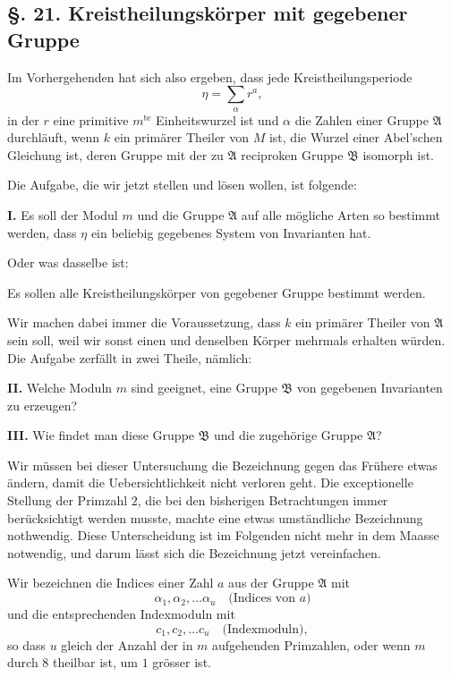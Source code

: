 \documentclass[12pt,a4paper]{article}
\theoremstyle{plain}
\theoremstyle{definition}
\theoremstyle{remark}
\begin{document}
\subsection*{\S. 21. Kreistheilungskörper mit gegebener Gruppe}

Im Vorhergehenden hat sich also ergeben, dass jede Kreistheilungsperiode
\[
\eta = \sum_{\alpha} r^{a},
\]
in der $r$ eine primitive $m^{\text{te}}$ Einheitswurzel ist und $\alpha$ die Zahlen
einer Gruppe $\mathfrak{A}$ durchläuft, wenn $k$ ein primärer Theiler von $M$
ist, die Wurzel einer Abel'schen Gleichung ist, deren Gruppe mit
der zu $\mathfrak{A}$ reciproken Gruppe $\mathfrak{B}$ isomorph ist.

Die Aufgabe, die wir jetzt stellen und lösen wollen, ist folgende:

\medskip\noindent\textbf{I.} Es soll der Modul $m$ und die Gruppe $\mathfrak{A}$ auf alle mögliche Arten so bestimmt werden, dass $\eta$ ein beliebig gegebenes System von Invarianten hat.

Oder was dasselbe ist:

Es sollen alle Kreistheilungskörper von gegebener Gruppe bestimmt werden.

\medskip
Wir machen dabei immer die Voraussetzung, dass $k$ ein primärer Theiler von $\mathfrak{A}$ sein soll, weil wir sonst einen und denselben Körper mehrmals erhalten würden. Die Aufgabe zerfällt in zwei Theile, nämlich:

\medskip\noindent\textbf{II.} Welche Moduln $m$ sind geeignet, eine Gruppe $\mathfrak{B}$ von gegebenen Invarianten zu erzeugen?

\medskip\noindent\textbf{III.} Wie findet man diese Gruppe $\mathfrak{B}$ und die zugehörige Gruppe $\mathfrak{A}$?

\medskip
Wir müssen bei dieser Untersuchung die Bezeichnung gegen das Frühere etwas ändern, damit die Uebersichtlichkeit nicht verloren geht. Die exceptionelle Stellung der Primzahl $2$, die bei den bisherigen Betrachtungen immer berücksichtigt werden musste, machte eine etwas umständliche Bezeichnung nothwendig. Diese Unterscheidung ist im Folgenden nicht mehr in dem Maasse notwendig, und darum lässt sich die Bezeichnung jetzt vereinfachen.

Wir bezeichnen die Indices einer Zahl $a$ aus der Gruppe $\mathfrak{A}$ mit
\[
\alpha_1, \alpha_2, \ldots \alpha_u \quad \text{(Indices von $a$)}
\]
und die entsprechenden Indexmoduln mit
\[
c_1, c_2, \ldots c_u \quad \text{(Indexmoduln)},
\]
so dass $u$ gleich der Anzahl der in $m$ aufgehenden Primzahlen,
oder wenn $m$ durch $8$ theilbar ist, um $1$ grösser ist.
\end{document}
